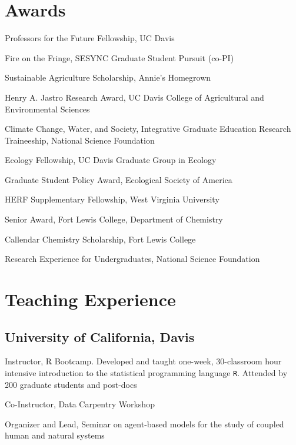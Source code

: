 \section{Awards}\label{awards}

\begin{description}
\tightlist
\item[2015]
Professors for the Future Fellowship, UC Davis
\item[2014]
Fire on the Fringe, SESYNC Graduate Student Pursuit (co-PI)
\item[2014]
Sustainable Agriculture Scholarship, Annie's Homegrown
\item[2014]
Henry A. Jastro Research Award, UC Davis College of Agricultural and
Environmental Sciences
\item[2012]
Climate Change, Water, and Society, Integrative Graduate Education
Research Traineeship, National Science Foundation
\item[2012]
Ecology Fellowship, UC Davis Graduate Group in Ecology
\item[2011]
Graduate Student Policy Award, Ecological Society of America
\item[2009]
HERF Supplementary Fellowship, West Virginia University
\item[2004]
Senior Award, Fort Lewis College, Department of Chemistry
\item[2003]
Callendar Chemistry Scholarship, Fort Lewis College
\item[2003]
Research Experience for Undergraduates, National Science Foundation
\end{description}

\section{Teaching Experience}\label{teaching-experience}

\subsection{University of California,
Davis}\label{university-of-california-davis}

\begin{description}
\tightlist
\item[2015]
Instructor, R Bootcamp. Developed and taught one-week, 30-classroom hour
intensive introduction to the statistical programming language
\texttt{R}. Attended by 200 graduate students and post-docs
\item[2015]
Co-Instructor, Data Carpentry Workshop
\item[2013]
Organizer and Lead, Seminar on agent-based models for the study of
coupled human and natural systems
\end{description}

